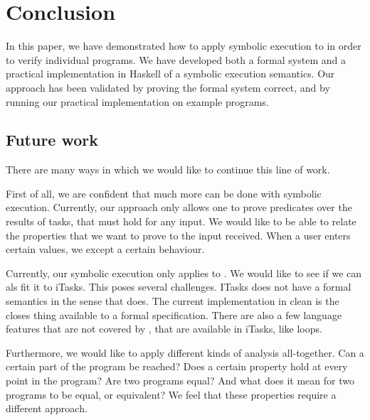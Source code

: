 
\section{Conclusion}

\label{sec:conclusion}

In this paper, we have demonstrated how to apply symbolic execution to \TOPHAT in order to verify individual programs.
We have developed both a formal system and a practical implementation in Haskell of a symbolic execution semantics.
Our approach has been validated by proving the formal system correct, and by running our practical implementation on example programs.

\subsection{Future work}

There are many ways in which we would like to continue this line of work.

First of all, we are confident that much more can be done with symbolic execution.
Currently, our approach only allows one to prove predicates over the results of tasks, that must hold for any input.
We would like to be able to relate the properties that we want to prove to the input received.
When a user enters certain values, we except a certain behaviour.

Currently, our symbolic execution only applies to \TOPHAT.
We would like to see if we can als fit it to iTasks.
This poses several challenges.
ITasks does not have a formal semantics in the sense that \TOPHAT does.
The current implementation in clean is the closes thing available to a formal specification.
There are also a few language features that are not covered by \TOPHAT, that are available in iTasks, like loops.


Furthermore, we would like to apply different kinds of analysis all-together.
Can a certain part of the program be reached?
Does a certain property hold at every point in the program?
Are two programs equal? And what does it mean for two programs to be equal, or equivalent?
We feel that these properties require a different  approach.
